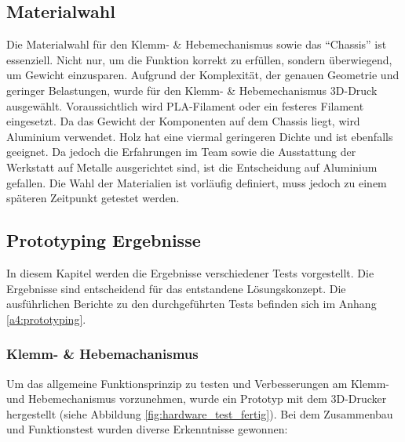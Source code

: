 \documentclass[../main.tex]{subfiles}
\begin{document}
\subsection{Materialwahl}
Die Materialwahl für den Klemm- \& Hebemechanismus sowie das \enquote{Chassis} ist essenziell. Nicht nur, um die Funktion korrekt zu erfüllen, sondern überwiegend, um Gewicht einzusparen. Aufgrund der Komplexität, der genauen Geometrie und geringer Belastungen, wurde für den Klemm- \& Hebemechanismus 3D-Druck ausgewählt. Voraussichtlich wird PLA-Filament oder ein festeres Filament eingesetzt. Da das Gewicht der Komponenten auf dem Chassis liegt, wird Aluminium verwendet. Holz hat eine viermal geringeren Dichte und ist ebenfalls geeignet. Da jedoch die Erfahrungen im Team sowie die Ausstattung der Werkstatt auf Metalle ausgerichtet sind, ist die Entscheidung auf Aluminium gefallen. Die Wahl der Materialien ist vorläufig definiert, muss jedoch zu einem späteren Zeitpunkt getestet werden.



\subsection{Prototyping Ergebnisse}
In diesem Kapitel werden die Ergebnisse verschiedener Tests vorgestellt. Die Ergebnisse sind entscheidend für das entstandene Lösungskonzept.
Die ausführlichen Berichte zu den durchgeführten Tests befinden sich im Anhang \ref{a4:prototyping}.

\subsubsection{Klemm- \& Hebemachanismus} \label{sec:hardware_greifarm}
Um das allgemeine Funktionsprinzip zu testen und Verbesserungen am Klemm- und Hebemechanismus vorzunehmen, wurde ein Prototyp mit dem 3D-Drucker hergestellt (siehe Abbildung \ref{fig:hardware_test_fertig}). Bei dem Zusammenbau und Funktionstest wurden diverse Erkenntnisse gewonnen:
\end{document}
